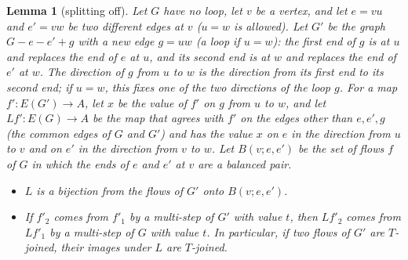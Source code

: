 \documentclass[11pt]{article}
\newtheorem{lemma}[theorem]{Lemma}
\theoremstyle{definition}
\begin{document}
\begin{lemma}[splitting off]\label{lem:split}
Let $G$ have no loop, let $v$ be a vertex, and let $e=vu$ and $e'=vw$ be two different edges at $v$ ($u=w$ is
allowed). Let $G'$ be the graph $G-e-e'+g$ with a new edge $g=uw$ (a loop if $u=w$): the first end of $g$ is at $u$ and
replaces the end of $e$ at $u$, and its second end is at $w$ and replaces the end of $e'$ at $w$. The direction of
$g$ \emph{from $u$ to $w$} is the direction from its first end to its second end; if $u=w$, this fixes one of the two
directions of the loop $g$. For a map $f'\colon E(G')\to A$, let $x$ be the value of $f'$ on $g$
from $u$ to $w$, and let $Lf'\colon E(G)\to A$ be the map that agrees with $f'$ on the edges other than $e,e',g$ (the common edges of $G$ and $G'$) and has the value $x$ on
$e$ in the direction from $u$ to $v$ and on $e'$ in the direction from $v$ to $w$. Let $B(v;e,e')$ be the set of flows
$f$ of $G$ in which the ends of $e$ and $e'$ at $v$ are a balanced pair.
\begin{itemize}
\item[(a)] $L$ is a bijection from the flows of $G'$ onto $B(v;e,e')$.
\item[(b)] If $f'_2$ comes from $f'_1$ by a multi-step of $G'$ with value $t$, then $Lf'_2$ comes from $Lf'_1$ by
a multi-step of $G$ with value $t$. In particular, if two flows of $G'$ are $T$-joined, their images under $L$ are
$T$-joined.
\end{itemize}
\end{lemma}
\end{document}
